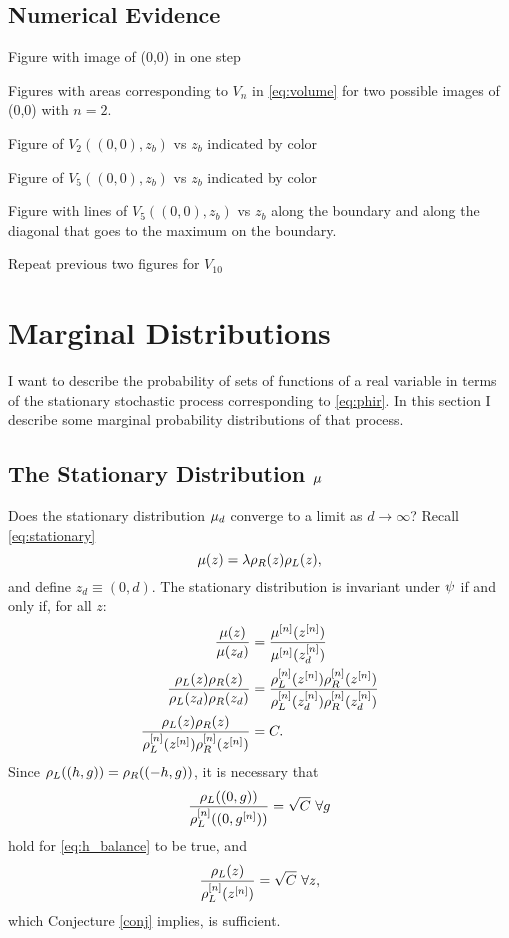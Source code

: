 \documentclass[twocolumn]{article}
\begin{document}
\subsection{Numerical Evidence}
\label{sec:evidence}

Figure with image of (0,0) in one step

Figures with areas corresponding to $V_n$ in \eqref{eq:volume} for two
possible images of (0,0) with $n=2$.

Figure of $V_2((0,0),z_b)$ vs $z_b$ indicated by color

Figure of $V_{5}((0,0),z_b)$ vs $z_b$ indicated by color

Figure with lines of $V_{5}((0,0),z_b)$ vs $z_b$ along the boundary
and along the diagonal that goes to the maximum on the boundary.

Repeat previous two figures for $V_{10}$

\section{Marginal Distributions}
\label{sec:marginal}

I want to describe the probability of sets of functions of a real
variable in terms of the stationary stochastic process corresponding
to \eqref{eq:phir}.  In this section I describe some marginal
probability distributions of that process.

\subsection{The Stationary Distribution $\mu$}
\label{sec:convergence}

Does the stationary distribution $\mu_d$ converge to a limit
as $d \rightarrow \infty$?
Recall \eqref{eq:stationary}
\begin{equation*}
  \mu(z) = \lambda \rho_R(z) \rho_L(z),
\end{equation*}
and define $z_d \equiv (0,d)$.  The stationary distribution is
invariant under $\psi_{}$ if and only if, for all $z$:
\begin{align}
  \frac{\stationary(z)}{\stationary(z_d)} &=
  \frac{\stationary\supn(z\supn)}{\stationary\supn(z\supn_d)} \nonumber\\
%
  \frac{\lefunc(z)\refunc(z)}{\lefunc(z_d)\refunc(z_d)} &=
  \frac{\lefunc\supn(z\supn)\refunc\supn(z\supn)}
       {\lefunc\supn(z_d\supn)\refunc\supn(z_d\supn)}
  \nonumber \\ 
  \label{eq:h_balance}
  \frac{\lefunc(z)\refunc(z)}
       {\lefunc\supn(z\supn)\refunc\supn(z\supn)} &= C.
\end{align}
Since $\rho_L((h,g)) = \rho_R((-h,g))$, it is necessary that
\begin{equation}
  \label{eq:h_zero}
  \frac{\rho_L((0,g))}{\rho_L^{[n]}((0,g^{[n]}))} = \sqrt{C} ~\forall g
\end{equation}
hold for \eqref{eq:h_balance} to be true, and
\begin{equation}
  \label{eq:h_any}
  \frac{\rho_L(z)}{\rho_L^{[n]}(z^{[n]})} = \sqrt{C} ~\forall z,
\end{equation}
which Conjecture \ref{conj} implies, is sufficient.
\end{document}
